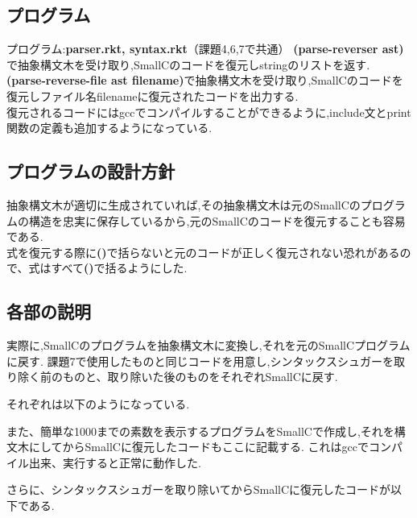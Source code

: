 \subsection{プログラム}
プログラム:\textbf{parser.rkt, syntax.rkt}（課題4,6,7で共通）
\textbf{(parse-reverser ast)}で抽象構文木を受け取り,SmallCのコードを復元しstringのリストを返す.\\
\textbf{(parse-reverse-file ast filename)}で抽象構文木を受け取り,SmallCのコードを復元しファイル名filenameに復元されたコードを出力する.\\
復元されるコードにはgccでコンパイルすることができるように,include文とprint関数の定義も追加するようになっている.\\
\subsection{プログラムの設計方針}
抽象構文木が適切に生成されていれば,その抽象構文木は元のSmallCのプログラムの構造を忠実に保存しているから,元のSmallCのコードを復元することも容易である.\\
式を復元する際に\textbf{()}で括らないと元のコードが正しく復元されない恐れがあるので、式はすべて\textbf{()}で括るようにした.
\subsection{各部の説明}
実際に,SmallCのプログラムを抽象構文木に変換し,それを元のSmallCプログラムに戻す.
課題7で使用したものと同じコードを用意し,シンタックスシュガーを取り除く前のものと、取り除いた後のものをそれぞれSmallCに戻す.

それぞれは以下のようになっている.


また、簡単な1000までの素数を表示するプログラムをSmallCで作成し,それを構文木にしてからSmallCに復元したコードもここに記載する.
これはgccでコンパイル出来、実行すると正常に動作した.

さらに、シンタックスシュガーを取り除いてからSmallCに復元したコードが以下である.	



